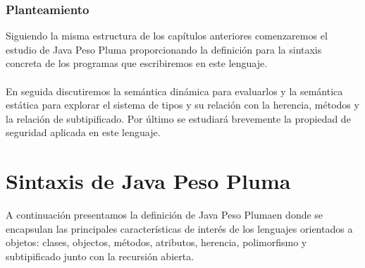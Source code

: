 \subsubsection{Planteamiento}
Siguiendo la misma estructura de los capítulos anteriores comenzaremos el estudio de \textsf{Java Peso Pluma} proporcionando la definición para la sintaxis concreta de los programas que escribiremos en este lenguaje. \\\\
En seguida discutiremos la semántica dinámica para evaluarlos y la semántica estática para explorar el sistema de tipos y su relación con la herencia, métodos y la relación de subtipificado.
Por último se estudiará brevemente la propiedad de seguridad aplicada en este lenguaje.

\section{Sintaxis de Java Peso Pluma}
A continuación presentamos la definición de \textsf{Java Peso Pluma}en donde se encapsulan las principales características de interés de los lenguajes orientados a objetos: clases, objectos, métodos, atributos, herencia, polimorfismo y subtipificado junto con la recursión abierta.

